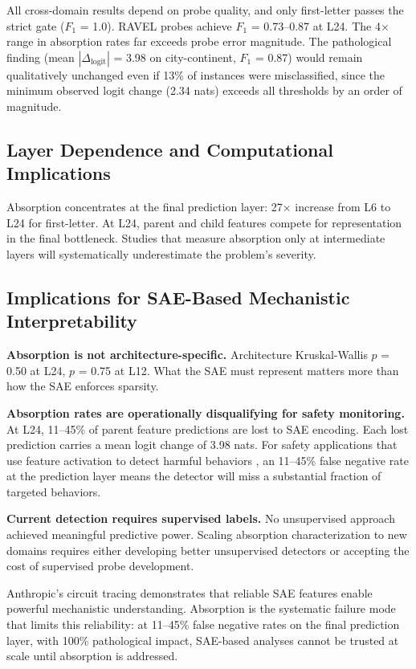 \documentclass{article}
\begin{document}
All cross-domain results depend on probe quality, and only first-letter passes the strict gate ($F_1$ = 1.0). RAVEL probes achieve $F_1$ = 0.73--0.87 at L24. The 4$\times$ range in absorption rates far exceeds probe error magnitude. The pathological finding (mean $|\Delta_{\text{logit}}|$ = 3.98 on city-continent, $F_1$ = 0.87) would remain qualitatively unchanged even if 13\% of instances were misclassified, since the minimum observed logit change (2.34 nats) exceeds all thresholds by an order of magnitude.

\subsection{Layer Dependence and Computational Implications}

Absorption concentrates at the final prediction layer: 27$\times$ increase from L6 to L24 for first-letter. At L24, parent and child features compete for representation in the final bottleneck. Studies that measure absorption only at intermediate layers will systematically underestimate the problem's severity.

\subsection{Implications for SAE-Based Mechanistic Interpretability}

\textbf{Absorption is not architecture-specific.} Architecture Kruskal-Wallis $p$ = 0.50 at L24, $p$ = 0.75 at L12. What the SAE must represent matters more than how the SAE enforces sparsity.

\textbf{Absorption rates are operationally disqualifying for safety monitoring.} At L24, 11--45\% of parent feature predictions are lost to SAE encoding. Each lost prediction carries a mean logit change of 3.98 nats. For safety applications that use feature activation to detect harmful behaviors \citep{templeton2024scaling}, an 11--45\% false negative rate at the prediction layer means the detector will miss a substantial fraction of targeted behaviors.

\textbf{Current detection requires supervised labels.} No unsupervised approach achieved meaningful predictive power. Scaling absorption characterization to new domains requires either developing better unsupervised detectors or accepting the cost of supervised probe development.

Anthropic's circuit tracing \citep{lindsey2025circuit} demonstrates that reliable SAE features enable powerful mechanistic understanding. Absorption is the systematic failure mode that limits this reliability: at 11--45\% false negative rates on the final prediction layer, with 100\% pathological impact, SAE-based analyses cannot be trusted at scale until absorption is addressed.
\end{document}
